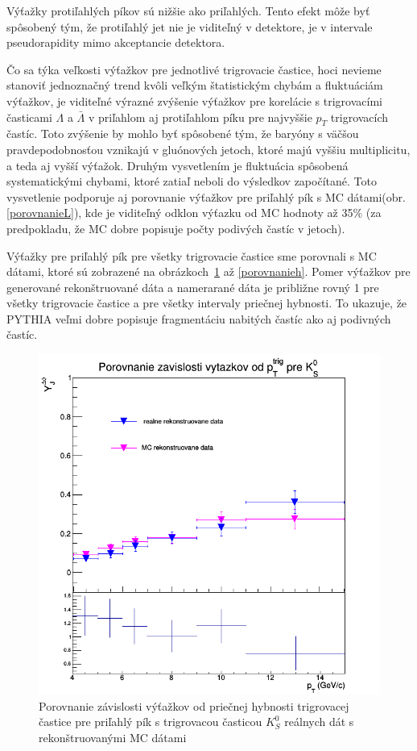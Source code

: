 \documentclass[thesismargins, thesislinespacing]{rnthesis}
\begin{document}
Výťažky protiľahlých píkov sú nižšie ako priľahlých. Tento efekt môže byť spôsobený tým, že protiľahlý jet nie je viditeľný v detektore, je v intervale pseudorapidity mimo akceptancie detektora. 

Čo sa týka veľkosti výťažkov pre jednotlivé trigrovacie častice, hoci nevieme stanoviť jednoznačný trend kvôli veľkým štatistickým chybám a fluktuáciám výťažkov, je viditeľné výrazné zvýšenie výťažkov pre korelácie s trigrovacími časticami $\Lambda$ a $\bar{\Lambda}$ v priľahlom aj protiľahlom píku pre najvyššie $p_T$ trigrovacích častíc. Toto zvýšenie by mohlo byť spôsobené tým, že baryóny s väčšou pravdepodobnosťou vznikajú v gluónových jetoch, ktoré majú vyššiu multiplicitu, a teda aj vyšší výťažok. Druhým vysvetlením je fluktuácia spôsobená systematickými chybami, ktoré zatiaľ neboli do výsledkov započítané. Toto vysvetlenie podporuje aj porovnanie výťažkov pre priľahlý pík s MC dátami(obr. \ref{porovnanieL}), kde je viditeľný odklon výťazku od MC hodnoty až 35\% (za predpokladu, že MC dobre popisuje počty podivých častíc v jetoch).    

Výťažky pre priľahlý pík pre všetky trigrovacie častice sme porovnali s MC dátami, ktoré sú zobrazené na obrázkoch~\ref{porovnanie} až \ref{porovnanieh}. Pomer výťažkov pre generované \-re\-konšt\-ru\-o\-va\-né dáta a namerarané dáta je približne rovný 1 pre všetky trigrovacie častice a pre všetky intervaly priečnej hybnosti. To ukazuje, že PYTHIA veľmi dobre popisuje fragmentáciu nabitých častíc ako aj podivných častíc. 

\begin{figure}[hbtp!]
	\centering
	\includegraphics[scale=0.4]{./Obrazky_praca/Vytazok_porovnanieMC.png}
	\caption{Porovnanie závislosti výťažkov od priečnej hybnosti trigrovacej častice pre priľahlý pík s trigrovacou časticou $K^0_S$ reálnych dát s rekonštruovanými MC dátami}
	\label{porovnanie}
\end{figure}
\end{document}

